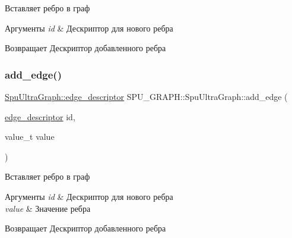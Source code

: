 Вставляет ребро в граф 
\begin{DoxyParams}{Аргументы}
{\em id} & Дескриптор для нового ребра \\
\hline
\end{DoxyParams}
\begin{DoxyReturn}{Возвращает}
Дескриптор добавленного ребра 
\end{DoxyReturn}
\mbox{\label{class_s_p_u___g_r_a_p_h_1_1_spu_ultra_graph_a8a869529155dcb1e380f8fb3a16720ee}} 
\subsubsection{\texorpdfstring{add\+\_\+edge()}{add\_edge()}\hspace{0.1cm}{\footnotesize\ttfamily [4/7]}}
{\footnotesize\ttfamily \hyperlink{class_s_p_u___g_r_a_p_h_1_1_spu_ultra_graph_a5f3776e003ef0a1648f1d9f84289810b}{Spu\+Ultra\+Graph\+::edge\+\_\+descriptor} S\+P\+U\+\_\+\+G\+R\+A\+P\+H\+::\+Spu\+Ultra\+Graph\+::add\+\_\+edge (\begin{DoxyParamCaption}\item[{\hyperlink{class_s_p_u___g_r_a_p_h_1_1_spu_ultra_graph_a5f3776e003ef0a1648f1d9f84289810b}{edge\+\_\+descriptor}}]{id,  }\item[{value\+\_\+t}]{value }\end{DoxyParamCaption})}

Вставляет ребро в граф 
\begin{DoxyParams}{Аргументы}
{\em id} & Дескриптор для нового ребра \\
\hline
{\em value} & Значение ребра \\
\hline
\end{DoxyParams}
\begin{DoxyReturn}{Возвращает}
Дескриптор добавленного ребра 
\end{DoxyReturn}
\mbox{\label{class_s_p_u___g_r_a_p_h_1_1_spu_ultra_graph_acf32b6a942095ea0c61b52b6596c8ecb}} 
